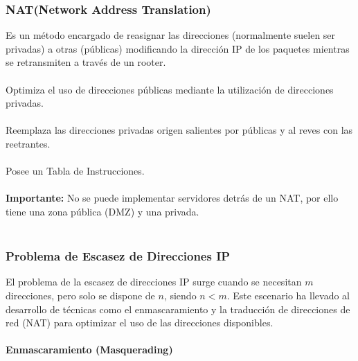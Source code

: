 \documentclass[a4paper,12pt]{article}
\begin{document}
\subsubsection{NAT(Network Address Translation)}

Es un método encargado de reasignar las direcciones (normalmente suelen ser privadas) a otras (públicas) modificando la dirección IP de los paquetes mientras se retransmiten a través de un rooter.\\\\
Optimiza el uso de direcciones públicas mediante la utilización de direcciones privadas.\\\\
Reemplaza las direcciones privadas origen salientes por públicas y al reves con las reetrantes.\\\\
Posee un Tabla de Instrucciones. \\\\
\textbf{Importante:} No se puede implementar servidores detrás de un NAT, por ello tiene una zona pública (DMZ) y una privada.\\\\



\subsubsection{Problema de Escasez de Direcciones IP}

El problema de la escasez de direcciones IP surge cuando se necesitan \( m \) direcciones, pero solo se dispone de \( n \), siendo \( n < m \). Este escenario ha llevado al desarrollo de técnicas como el enmascaramiento y la traducción de direcciones de red (NAT) para optimizar el uso de las direcciones disponibles.

\paragraph{Enmascaramiento (Masquerading)}
\end{document}
